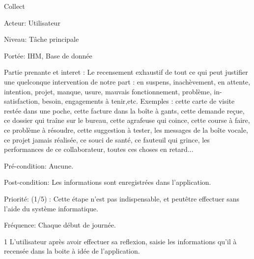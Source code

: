 \begin{usecase}{Collect}

\begin{information}
\item[Acteur:] Utilisateur
\item[Niveau:] Tâche principale
\item[Portée:] IHM, Base de donnée
\item[Partie prenante et interet :]
	Le recensement exhaustif de tout ce qui peut justifier une quelconque intervention de notre part : en suspens, inachèvement, en attente, intention, projet, manque, usure, mauvais fonctionnement, problème, in- satisfaction, besoin, engagements à tenir,etc.
Exemples : cette carte de visite restée dans une poche, cette facture dans la boîte à gants, cette demande reçue, ce dossier qui traîne sur le bureau, cette agrafeuse qui coince, cette course à faire, ce problème à résoudre, cette suggestion à tester, les messages de la boîte vocale, ce projet jamais réalisée, ce souci de santé, ce fauteuil qui grince, les performances de ce collaborateur, toutes ces choses en retard...
\item[Pré-condition:] Aucune. 
\item[Post-condition:] Les informations sont enregistrées dans l'application.
\item[Priorité:] (1/5) : Cette étape n'est pas indispensable, et peutêtre effectuer sans l'aide du système informatique.
\item[Fréquence:] Chaque début de journée.
\end{information}	

\begin{scenario}
\item[1] L'utilisateur après avoir effectuer sa reflexion, saisie les informations qu'il à recensée dans la boite à idée de l'application.
\end{scenario}

	
\end{usecase}


